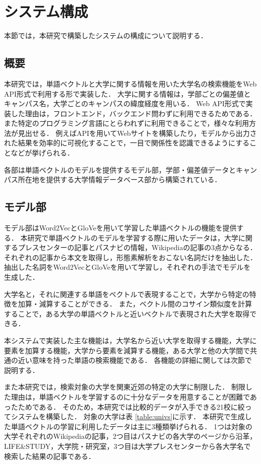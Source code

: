\section{システム構成}
本節では，本研究で構築したシステムの構成について説明する．

\subsection{概要}
本研究では，単語ベクトルと大学に関する情報を用いた大学名の検索機能をWeb API形式で利用する形で実装した．
大学に関する情報は，学部ごとの偏差値とキャンパス名，大学ごとのキャンパスの緯度経度を用いる．
Web API形式で実装した理由は，フロントエンド，バックエンド問わずに利用できるためである．
また特定のプログラミング言語にとらわれずに利用できることで，様々な利用方法が見出せる．
例えばAPIを用いてWebサイトを構築したり，モデルから出力された結果を効率的に可視化することで，一目で関係性を認識できるようにすることなどが挙げられる．

各部は単語ベクトルのモデルを提供するモデル部，学部・偏差値データとキャンパス所在地を提供する大学情報データベース部から構築されている．


\subsection{モデル部}
モデル部はWord2VecとGloVeを用いて学習した単語ベクトルの機能を提供する．
本研究で単語ベクトルのモデルを学習する際に用いたデータは，大学に関するプレスセンターの記事とパスナビ\cite{passNavi}の情報，Wikipediaの記事の3点からなる．
それぞれの記事から本文を取得し，形態素解析をおこない名詞だけを抽出した．
抽出した名詞をWord2VecとGloVeを用いて学習し，それぞれの手法でモデルを生成した．

大学名と，それに関連する単語をベクトルで表現することで，大学から特定の特徴を加算・減算することができる．
また，ベクトル間のコサイン類似度を計算することで，ある大学の単語ベクトルと近いベクトルで表現された大学を取得できる．

本システムで実装した主な機能は，大学名から近い大学を取得する機能，大学に要素を加算する機能，大学から要素を減算する機能，ある大学と他の大学間で共通の近い意味を持った単語の検索機能である．
各機能の詳細に関しては次節で説明する．

また本研究では，検索対象の大学を関東近郊の特定の大学に制限した．
制限した理由は，単語ベクトルを学習するのに十分なデータを用意することが困難であったためである．
そのため，本研究では比較的データが入手できる21校に絞ってシステムを構築した．
対象の大学は表 \ref{table:univs}に示す．
本研究で生成した単語ベクトルの学習に利用したデータは主に3種類挙げられる．
1つは対象の大学それぞれのWikipediaの記事，2つ目はパスナビの各大学のページから沿革，LIFE\&STUDY，大学院・研究室，3つ目は大学プレスセンターから各大学名で検索した結果の記事である．

